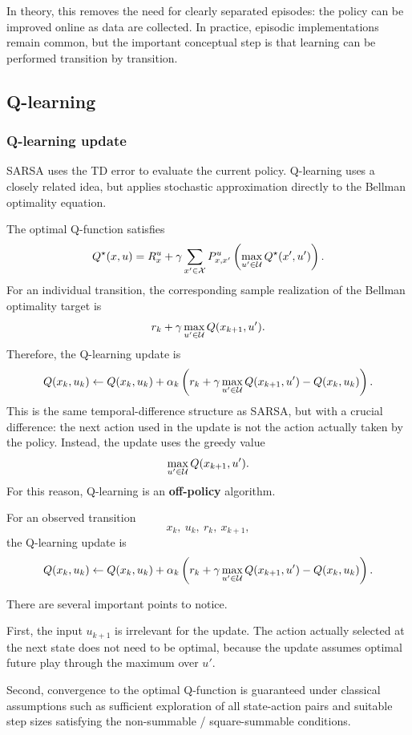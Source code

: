 In theory, this removes the need for clearly separated episodes: the policy can be improved
online as data are collected. In practice, episodic implementations remain common, but the
important conceptual step is that learning can be performed transition by transition.

\subsection{Q-learning}

\subsubsection{Q-learning update}

SARSA uses the TD error to evaluate the current policy. Q-learning uses a closely related idea,
but applies stochastic approximation directly to the Bellman optimality equation.

The optimal Q-function satisfies
\[
Q^\star(x,u)
=
R_x^u
+
\gamma\sum_{x'\in\mathcal{X}}P^u_{x,x'}
\left(
\max_{u'\in\mathcal{U}}Q^\star(x',u')
\right).
\]
For an individual transition, the corresponding sample realization of the Bellman optimality
target is
\[
r_k+\gamma\max_{u'\in\mathcal{U}}Q(x_{k+1},u').
\]
Therefore, the Q-learning update is
\[
Q(x_k,u_k)
\leftarrow
Q(x_k,u_k)
+
\alpha_k
\left(
r_k
+
\gamma\max_{u'\in\mathcal{U}}Q(x_{k+1},u')
-
Q(x_k,u_k)
\right).
\]
This is the same temporal-difference structure as SARSA, but with a crucial difference: the next
action used in the update is not the action actually taken by the policy. Instead, the update uses
the greedy value
\[
\max_{u'\in\mathcal{U}}Q(x_{k+1},u').
\]
For this reason, Q-learning is an \textbf{off-policy} algorithm.

\begin{theorembox}
For an observed transition
\[
x_k,\ u_k,\ r_k,\ x_{k+1},
\]
the Q-learning update is
\[
Q(x_k,u_k)
\leftarrow
Q(x_k,u_k)
+
\alpha_k
\left(
r_k
+
\gamma\max_{u'\in\mathcal{U}}Q(x_{k+1},u')
-
Q(x_k,u_k)
\right).
\]
\end{theorembox}

There are several important points to notice.

First, the input \(u_{k+1}\) is irrelevant for the update. The action actually selected at the next
state does not need to be optimal, because the update assumes optimal future play through the
maximum over \(u'\).

Second, convergence to the optimal Q-function is guaranteed under classical assumptions such
as sufficient exploration of all state-action pairs and suitable step sizes satisfying the
non-summable / square-summable conditions.

